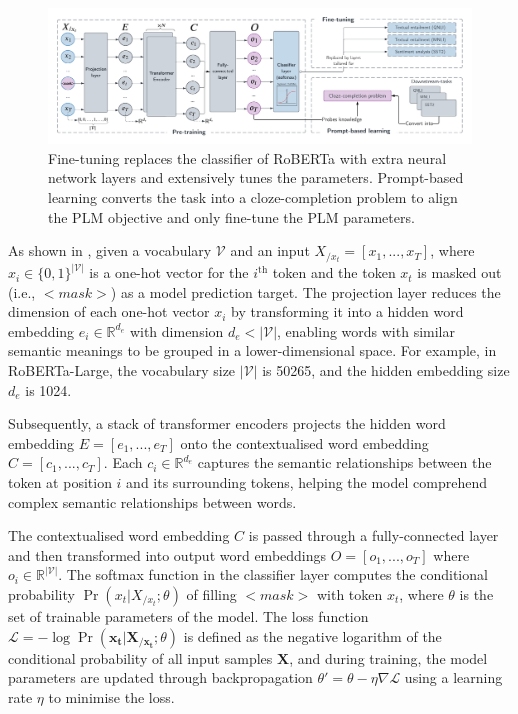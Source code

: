 \begin{figure}[!ht]
    \centering
    \includegraphics[width=\hsize]{figures/preparation_media/prepare-plm.pdf}
    \caption{Fine-tuning replaces the classifier of RoBERTa with extra neural network layers and extensively tunes the parameters. Prompt-based learning converts the task into a cloze-completion problem to align the PLM objective and only fine-tune the PLM parameters.}
    \label{fig:prepare-plm}
\end{figure}

As shown in , given a vocabulary $\mathcal{V}$ and an input $X_{/x_t} = [x_1, ... , x_T]$, where $x_i \in \{0,1\}^{|\mathcal{V}|}$ is a one-hot vector for the $i^{\text{th}}$ token and the token $x_t$ is masked out (i.e., $<$$\textit{mask}$$>$) as a model prediction target. The projection layer reduces the dimension of each one-hot vector $x_i$ by transforming it into a hidden word embedding $e_i \in \mathbb{R}^{d_e}$ with dimension $d_e < |\mathcal{V}|$, enabling words with similar semantic meanings to be grouped in a lower-dimensional space. For example, in RoBERTa-Large, the vocabulary size $|\mathcal{V}|$ is 50265, and the hidden embedding size $d_e$ is 1024. 

Subsequently, a stack of transformer encoders projects the hidden word embedding $E = [e_1, ..., e_T]$ onto the contextualised word embedding $C = [c_1, ..., c_T]$. Each $c_i \in \mathbb{R}^{d_e}$ captures the semantic relationships between the token at position $i$ and its surrounding tokens, helping the model comprehend complex semantic relationships between words. 

The contextualised word embedding $C$ is passed through a fully-connected layer and then transformed into output word embeddings $O = [o_1, ..., o_T]$ where $o_i \in \mathbb{R}^{|\mathcal{V}|}$. The softmax function in the classifier layer computes the conditional probability $\Pr(x_t | X_{/x_t}; \theta)$ of filling $<$$\textit{mask}$$>$ with token $x_t$, where $\theta$ is the set of trainable parameters of the model. The loss function $\mathcal{L} = -\log \Pr(\boldsymbol{x_t}|\boldsymbol{X_{/x_t}}; \theta)$ is defined as the negative logarithm of the conditional probability of all input samples $\boldsymbol{X}$, and during training, the model parameters are updated through backpropagation $\theta' = \theta - \eta \nabla\mathcal{L}$ using a learning rate $\eta$ to minimise the loss.

